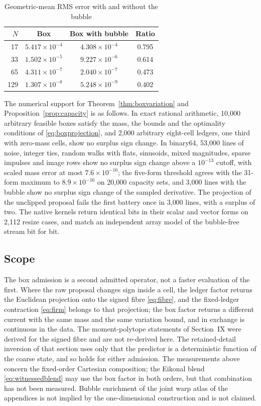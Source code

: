 \documentclass[journal]{IEEEtran}
\begin{document}
\begin{table}[H]
\caption{Geometric-mean RMS error with and without the bubble}
\label{tab:bubblegain}
\centering
\scriptsize
\begin{tabular}{r|ccc}
\hline
$N$ & Box & Box with bubble & Ratio\\
\hline
17  & $5.417\times10^{-4}$ & $4.308\times10^{-4}$ & 0.795\\
33  & $1.502\times10^{-5}$ & $9.227\times10^{-6}$ & 0.614\\
65  & $4.311\times10^{-7}$ & $2.040\times10^{-7}$ & 0.473\\
129 & $1.307\times10^{-8}$ & $5.248\times10^{-9}$ & 0.402\\
\hline
\end{tabular}
\end{table}

The numerical support for Theorem~\ref{thm:boxvariation} and
Proposition~\ref{prop:capacity} is as follows. In exact rational
arithmetic, 10{,}000 arbitrary feasible boxes satisfy the mass, the
bounds and the optimality conditions of \eqref{eq:boxprojection}, and
2{,}000 arbitrary eight-cell ledgers, one third with zero-mass cells,
show no surplus sign change. In binary64, 53{,}000 lines of noise,
integer ties, random walks with flats, sinusoids, mixed magnitudes,
sparse impulses and image rows show no surplus sign change above a
\(10^{-13}\) cutoff, with scaled mass error at most
\(7.6\times10^{-16}\); the five-form threshold agrees with the 31-form
maximum to \(8.9\times10^{-16}\) on 20{,}000 capacity sets, and 3{,}000
lines with the bubble show no surplus sign change of the sampled
derivative. The projection of the unclipped proposal fails the first
battery once in 3{,}000 lines, with a surplus of two. The native
kernels return identical bits in their scalar and vector forms on
2{,}112 resize cases, and match an independent array model of the
bubble-free stream bit for bit.

\subsection{Scope}

The box admission is a second admitted operator, not a faster evaluation
of the first. Where the raw proposal changes sign inside a cell, the
ledger factor returns the Euclidean projection onto the signed fibre
\eqref{eq:fibre}, and the fixed-ledger contraction \eqref{eq:firm}
belongs to that projection; the box factor returns a different current
with the same mass and the same variation bound, and in exchange is
continuous in the data. The moment-polytope statements of Section~IX
were derived for the signed fibre and are not re-derived here. The
retained-detail inversion of that section uses only that the predictor
is a deterministic function of the coarse state, and so holds for either
admission. The measurements above concern the fixed-order Cartesian
composition; the Eikonal blend \eqref{eq:witnessedblend} may use the box
factor in both orders, but that combination has not been measured.
Bubble enrichment of the joint warp atlas of the appendices is not
implied by the one-dimensional construction and is not claimed.
\end{document}
